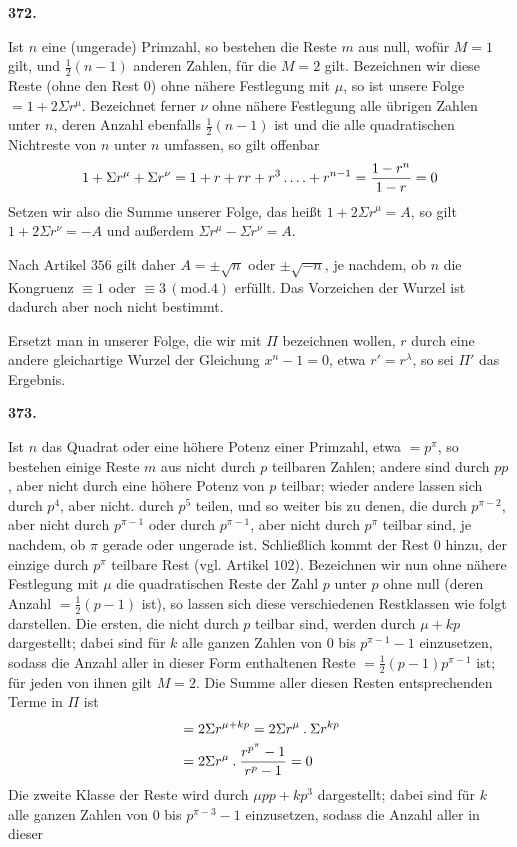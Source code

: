 \par\medskip{}\centerline{\textbf{372.}}\nobreak\smallskip
Ist $n$ eine (ungerade) Primzahl, so bestehen die Reste $m$ aus null, wofür $M=1$ gilt, und $\frac12(n-1)$ anderen Zahlen, für die $M=2$ gilt. Bezeichnen wir diese Reste (ohne den Rest $0$) ohne nähere Festlegung mit $\mu$, so ist unsere Folge $=1+2\Sigma r^\mu$. Bezeichnet ferner $\nu$ ohne nähere Festlegung alle übrigen Zahlen unter $n$, deren Anzahl ebenfalls $\frac12(n-1)$ ist und die alle quadratischen Nichtreste von $n$ unter $n$ umfassen, so gilt offenbar
\[
1+\Sigma r^\mu+\Sigma r^\nu=1+r+rr+r^3\mathinner{.\,.\,.\,.}+r^{n-1}=\frac{1-r^n}{1-r}=0
\]
Setzen wir also die Summe unserer Folge, das heißt $1+2\Sigma r^\mu=A$, so gilt $1+2\Sigma r^\nu=-A$ und außerdem $\Sigma r^\mu-\Sigma r^\nu=A$.
\par Nach Artikel $356$ gilt daher $A=\pm\surd n$ oder $\pm\surd{-n}$, je nachdem, ob $n$ die Kongruenz $\equiv1$ oder $\equiv3\, (\mathrm{mod}.4)$ erfüllt. Das Vorzeichen der Wurzel ist dadurch aber noch nicht bestimmt.
\par Ersetzt man in unserer Folge, die wir mit $\Pi$ bezeichnen wollen, $r$ durch eine andere gleichartige Wurzel der Gleichung $x^n-1=0$, etwa $r'=r^\lambda$, so sei $\Pi'$ das Ergebnis.
\par\medskip{}\centerline{\textbf{373.}}\nobreak\smallskip
Ist $n$ das Quadrat oder eine höhere Potenz einer Primzahl, etwa $=p^\pi$, so bestehen einige Reste $m$ aus nicht durch $p$ teilbaren Zahlen; andere sind durch $pp$, aber nicht durch eine höhere Potenz von $p$ teilbar; wieder andere lassen sich durch $p^4$, aber nicht. durch $p^5$ teilen, und so weiter bis zu denen, die durch $p^{\pi-2}$, aber nicht durch $p^{\pi-1}$ oder durch $p^{\pi-1}$, aber nicht durch $p^\pi$ teilbar sind, je nachdem, ob $\pi$ gerade oder ungerade ist. Schließlich kommt der Rest $0$ hinzu, der einzige durch $p^\pi$ teilbare Rest (vgl. Artikel $102$). Bezeichnen wir nun ohne nähere Festlegung mit $\mu$ die quadratischen Reste der Zahl $p$ unter $p$ ohne null (deren Anzahl $=\frac12(p-1)$ ist), so lassen sich diese verschiedenen Restklassen wie folgt darstellen. Die ersten, die nicht durch $p$ teilbar sind, werden durch $\mu+kp$ dargestellt; dabei sind für $k$ alle ganzen Zahlen von $0$ bis $p^{\pi-1}-1$ einzusetzen, sodass die Anzahl aller in dieser Form enthaltenen Reste $=\frac12(p-1)p^{\pi-1}$ ist; für jeden von ihnen gilt $M=2$. Die Summe aller diesen Resten entsprechenden Terme in $\Pi$ ist
\[
\begin{aligned}
&=2\Sigma r^{\mu+kp}=2\Sigma r^\mu\mathbin{.}\Sigma r^{kp}\\
&=2\Sigma r^\mu\mathbin{.}\frac{r^{p^\pi}-1}{r^p-1}=0
\end{aligned}
\]
Die zweite Klasse der Reste wird durch $\mu pp+kp^3$ dargestellt; dabei sind für $k$ alle ganzen Zahlen von $0$ bis $p^{\pi-3}-1$ einzusetzen, sodass die Anzahl aller in dieser
